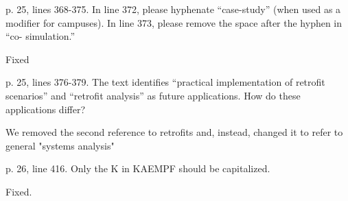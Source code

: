 \documentclass[answers,12pt]{exam}
\begin{document}
\begin{questions}
\question  p. 25, lines 368-375. In line 372, please hyphenate “case-study” (when used as a modifier for campuses). In line 373, please remove the space after the hyphen in “co- simulation.”
\begin{solution}
Fixed
\end{solution}

\question   p. 25, lines 376-379. The text identifies “practical implementation of retrofit scenarios” and “retrofit analysis” as future applications. How do these applications differ?
\begin{solution}
We removed the second reference to retrofits and, instead, changed it to refer to general "systems analysis"
\end{solution}

\question   p. 26, line 416. Only the K in KAEMPF should be capitalized.
\begin{solution}
Fixed.
\end{solution}


\end{questions}
\end{document}
